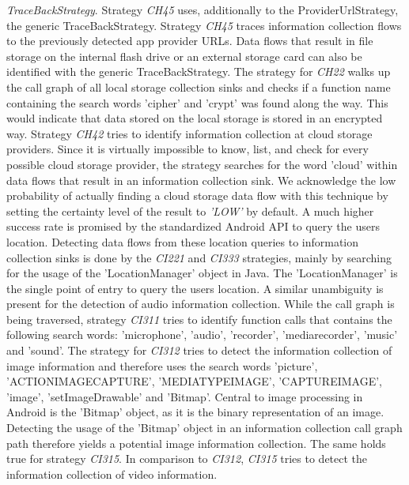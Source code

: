 \textit{TraceBackStrategy}.
Strategy \textit{CH45} uses, additionally to the ProviderUrlStrategy, the generic TraceBackStrategy.
Strategy \textit{CH45} traces information collection flows to the previously detected app provider URLs.
Data flows that result in file storage on the internal flash drive or an external storage card can also be identified with the generic TraceBackStrategy.
The strategy for \textit{CH22} walks up the call graph of all local storage collection sinks and checks if a function name containing the search words 'cipher' and 'crypt' was found along the way.
This would indicate that data stored on the local storage is stored in an encrypted way.
Strategy \textit{CH42} tries to identify information collection at cloud storage providers.
Since it is virtually impossible to know, list, and check for every possible cloud storage provider, the strategy searches for the word 'cloud' within data flows that result in an information collection sink.
We acknowledge the low probability of actually finding a cloud storage data flow with this technique by setting the certainty level of the result to \textit{'LOW'} by default.
A much higher success rate is promised by the standardized Android API to query the users location.
Detecting data flows from these location queries to information collection sinks is done by the \textit{CI221} and \textit{CI333} strategies, mainly by searching for the usage of the 'LocationManager' object in Java.
The 'LocationManager' is the single point of entry to query the users location.
A similar unambiguity is present for the detection of audio information collection.
While the call graph is being traversed, strategy \textit{CI311} tries to identify function calls that contains the following search words: 'microphone', 'audio', 'recorder', 'mediarecorder', 'music' and 'sound'.
The strategy for \textit{CI312} tries to detect the information collection of image information and therefore uses the search words 'picture', 'ACTION\textunderscore IMAGE\textunderscore CAPTURE', 'MEDIA\textunderscore TYPE\textunderscore IMAGE', 'CAPTURE\textunderscore IMAGE', 'image', 'setImageDrawable' and 'Bitmap'.
Central to image processing in Android is the 'Bitmap' object, as it is the binary representation of an image.
Detecting the usage of the 'Bitmap' object in an information collection call graph path therefore yields a potential image information collection.
The same holds true for strategy \textit{CI315}. 
In comparison to \textit{CI312}, \textit{CI315} tries to detect the information collection of video information.
